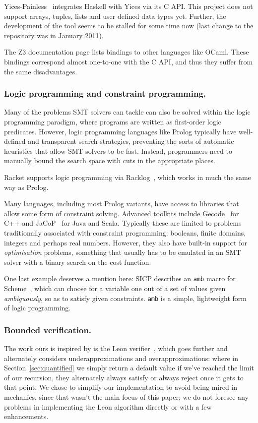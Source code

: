 Yices-Painless~\cite{yices-painless} integrates Haskell with Yices via its C
API. This project does not support arrays, tuples, lists and user defined data
types yet. Further, the development of the tool seems to be stalled for some
time now (last change to the repository was in January 2011).

The Z3 documentation page lists bindings to other languages like OCaml. These
bindings correspond almost one-to-one with the C API, and thus they suffer
from the same disadvantages.

\subsubsection{Logic programming and constraint programming.}

Many of the problems SMT solvers can tackle can also be solved within the
logic programming paradigm, where programs are written as first-order logic
predicates. However, logic programming languages like Prolog typically have
well-defined and transparent search strategies, preventing the sorts of
automatic heuristics that allow SMT solvers to be fast. Instead, programmers
need to manually bound the search space with cuts in the appropriate places.

Racket supports logic programming via Racklog~\cite{racklog}, which works in
much the same way as Prolog.

Many languages, including most Prolog variants, have access to libraries that
allow some form of constraint solving. Advanced toolkits include
Gecode~\cite{gecode} for C++ and JaCoP~\cite{JaCoP} for Java and Scala.
Typically these are limited to problems traditionally associated with
constraint programming: booleans, finite domains, integers and perhaps real
numbers. However, they also have built-in support for \textit{optimisation}
problems, something that usually has to be emulated in an SMT solver with a
binary search on the cost function.

One last example deserves a mention here: SICP describes an \texttt{amb} macro
for Scheme~\cite[Section~4.3]{sicp}, which can choose for a variable one out
of a set of values given \textit{ambiguously}, so as to satisfy given
constraints. \texttt{amb} is a simple, lightweight form of logic programming.

\subsubsection{Bounded verification.}

The work ours is inspired by is the Leon verifier~\cite{sat-recursive}, which
goes further and alternately considers underapproximations and
overapproximations: where in Section~\ref{sec:quantified} we simply return a
default value if we've reached the limit of our recursion, they alternately
always satisfy or always reject once it gets to that point. We chose to
simplify our implementation to avoid being mired in mechanics, since that
wasn't the main focus of this paper; we do not foresee any problems in
implementing the Leon algorithm directly or with a few enhancements.
